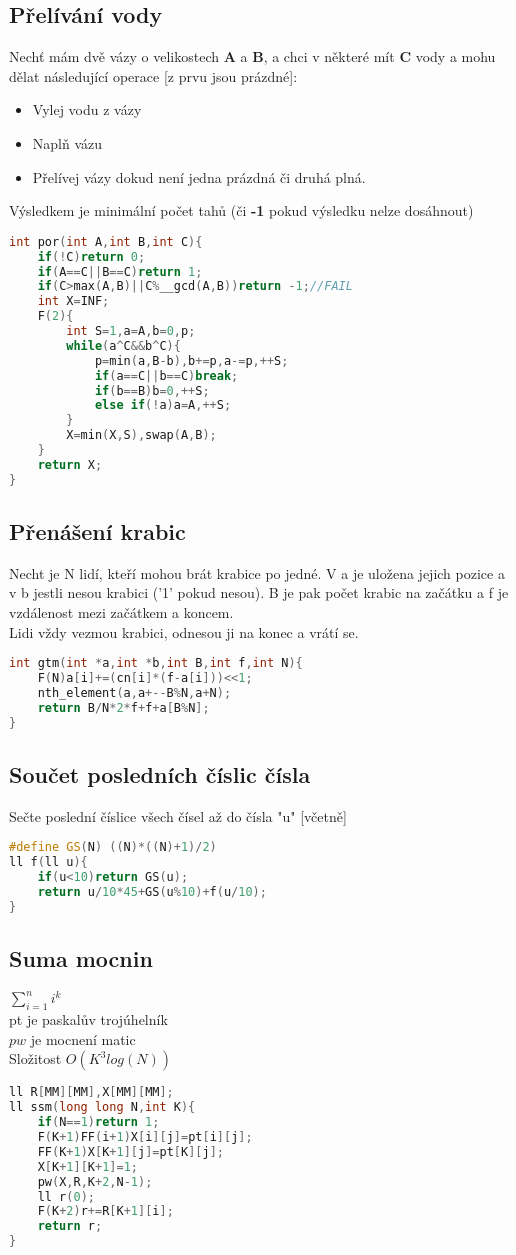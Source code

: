 \documentclass[11pt]{article}
\begin{document}
\subsection{Přelívání vody}
Nechť mám dvě vázy o velikostech \textbf{A} a \textbf{B}, a chci v některé mít \textbf{C} vody a mohu dělat následující operace [z prvu jsou prázdné]:
\begin{itemize}
\item Vylej vodu z vázy
\item Naplň vázu
\item Přelívej vázy dokud není jedna prázdná či druhá plná.
\end{itemize}
Výsledkem je minimální počet tahů (či \textbf{-1} pokud výsledku nelze dosáhnout)
\begin{lstlisting}[language=C++]
int por(int A,int B,int C){
    if(!C)return 0;
    if(A==C||B==C)return 1;
    if(C>max(A,B)||C%__gcd(A,B))return -1;//FAIL
    int X=INF;
    F(2){
        int S=1,a=A,b=0,p;
        while(a^C&&b^C){
            p=min(a,B-b),b+=p,a-=p,++S;
            if(a==C||b==C)break;
            if(b==B)b=0,++S; 
            else if(!a)a=A,++S;
        }
        X=min(X,S),swap(A,B);
    }
    return X;
}
\end{lstlisting}
\subsection{Přenášení krabic}
Necht je \textsf{N} lidí, kteří mohou brát krabice po jedné. V \textsf{a} je uložena jejich pozice a v \textsf{b} jestli nesou krabici ('1' pokud nesou). \textsf{B} je pak počet krabic na začátku a \textsf{f} je vzdálenost mezi začátkem a koncem.
\\Lidi vždy vezmou krabici, odnesou ji na konec a vrátí se.
\begin{lstlisting}[language=C++]
int gtm(int *a,int *b,int B,int f,int N){
    F(N)a[i]+=(cn[i]*(f-a[i]))<<1;
    nth_element(a,a+--B%N,a+N);
    return B/N*2*f+f+a[B%N];
}
\end{lstlisting}
\subsection{Součet posledních číslic čísla}
Sečte poslední číslice všech čísel až do čísla "u" [včetně]
\begin{lstlisting}[language=C++]
#define GS(N) ((N)*((N)+1)/2)
ll f(ll u){
    if(u<10)return GS(u);
    return u/10*45+GS(u%10)+f(u/10);
}
\end{lstlisting}
\subsection{Suma mocnin}
$\sum\limits_{i=1}^n i^k$
\\\textsf{pt} je paskalův trojúhelník
\\$pw$ je mocnení matic
\\Složitost $O(K^3log(N))$
\begin{lstlisting}[language=C++]
ll R[MM][MM],X[MM][MM];
ll ssm(long long N,int K){
    if(N==1)return 1;
    F(K+1)FF(i+1)X[i][j]=pt[i][j];
    FF(K+1)X[K+1][j]=pt[K][j];
    X[K+1][K+1]=1;
    pw(X,R,K+2,N-1);
    ll r(0);
    F(K+2)r+=R[K+1][i];
    return r;
}
\end{lstlisting}
\end{document}
